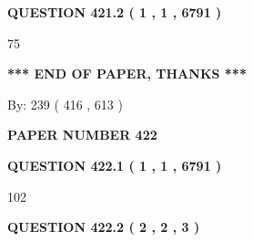 \documentclass[12pt]{article}
\begin{document}
 
 
 
  
\vspace{0.2in}
  
{\textbf{\Large{QUESTION
421.2 
 ( 1 , 1 , 6791 )
}}}
  
  
 
 
\noindent{}

75
 
 
   
   
 \vspace{0.2in}
 
   
   
   
   
\vspace{1.0in} 
{\textbf{\large{ *** END OF PAPER, THANKS *** }}} 
   
   
\hspace{1.0in} By: 
 239 ( 416 ,  613 )
   
   
   
   
\newpage 
\setcounter{page}{ 
   422001 } 
   
   
   
   
 {\textbf{ \Large{ PAPER NUMBER  422  }}}
   
   
\vspace{0.2in}
   
   
   
   
   
   
 \vspace{0.2in}
 
 
 
 
   
   
  
\vspace{0.2in}
  
{\textbf{\Large{QUESTION
422.1 
 ( 1 , 1 , 6791 )
}}}
  
  
 
 
\noindent{}

102
 
 
  
\vspace{0.2in}
  
{\textbf{\Large{QUESTION
422.2 
 ( 2 , 2 , 3 )
}}}
  
  
 
 
\noindent{}
 
\end{document}
